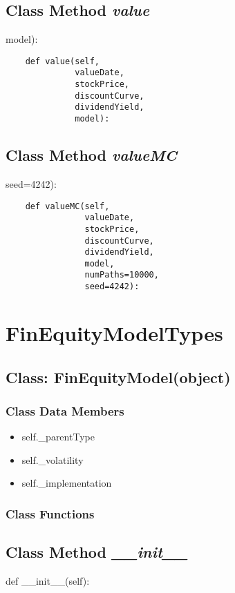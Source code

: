 \documentclass[twoside,11pt]{book}
\begin{document}
\subsection{Class Method {\it value}}
model):

\begin{lstlisting}
    def value(self,
              valueDate,
              stockPrice,
              discountCurve,
              dividendYield,
              model):
\end{lstlisting}

\subsection{Class Method {\it valueMC}}
seed=4242):

\begin{lstlisting}
    def valueMC(self,
                valueDate,
                stockPrice,
                discountCurve,
                dividendYield,
                model,
                numPaths=10000,
                seed=4242):
\end{lstlisting}

\newpage
\section{FinEquityModelTypes}

\subsection{Class: FinEquityModel(object)}


\subsubsection{Class Data Members}
\begin{itemize}
\item{self.\_parentType}
\item{self.\_volatility}
\item{self.\_implementation}
\end{itemize}

\subsubsection{Class Functions}

\subsection{Class Method {\it \_\_init\_\_}}
def \_\_init\_\_(self):
\end{document}
